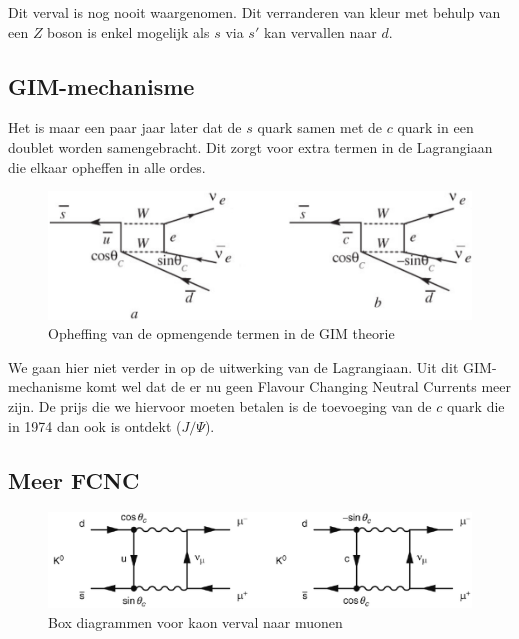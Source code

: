 \documentclass[../main.tex]{subfiles}
\begin{document}
Dit verval is nog nooit waargenomen. Dit verranderen van kleur met behulp van een $Z$ boson is enkel mogelijk als $s$ via $s'$ kan vervallen naar $d$.

\subsection{GIM-mechanisme}%
\label{sub:gim_mechanisme}

Het is maar een paar jaar later dat de $s$ quark samen met de $c$ quark in een doublet worden samengebracht. Dit zorgt voor extra termen in de Lagrangiaan die elkaar opheffen in alle ordes.

\begin{figure}[h]
    \centering
    \includegraphics[width=0.6\linewidth]{meson_mixing_and_oscillations/gim_opheffing.png}
    \caption{Opheffing van de opmengende termen in de GIM theorie}%
    \label{fig:meson_mixing_and_oscillations/gim_opheffing}
\end{figure}

We gaan hier niet verder in op de uitwerking van de Lagrangiaan. Uit dit GIM-mechanisme komt wel dat de er nu geen Flavour Changing Neutral Currents meer zijn. De prijs die we hiervoor moeten betalen is de toevoeging van de $c$ quark die in 1974 dan ook is ontdekt ($J/\Psi$).

\subsection{Meer FCNC}%
\label{sub:meer_fcnc}

\begin{figure}[h]
    \centering
    \includegraphics[width=0.8\linewidth]{meson_mixing_and_oscillations/fcnc.png}
    \caption{Box diagrammen voor kaon verval naar muonen}%
    \label{fig:meson_mixing_and_oscillations/fcnc}
\end{figure}
\end{document}
